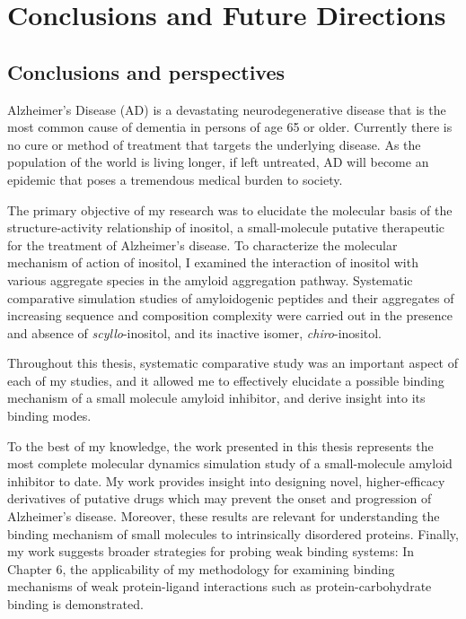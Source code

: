 

\chapter{Conclusions and Future Directions}
\section{Conclusions and perspectives}
Alzheimer's Disease (AD) is a devastating neurodegenerative disease that is the most common cause of dementia in persons of age 65 or older. Currently there is no cure or method of treatment that targets the underlying disease.  As the population of the world is living longer, if left untreated, AD will become an epidemic that poses a tremendous medical burden to society. 

The primary objective of my research was to elucidate the molecular basis of the structure-activity relationship of inositol, a small-molecule putative therapeutic for the treatment of Alzheimer's disease.  To characterize the molecular mechanism of action of inositol, I examined the interaction of inositol with various aggregate species in the amyloid aggregation pathway. Systematic comparative simulation studies of amyloidogenic peptides and their aggregates of increasing sequence and composition complexity were carried out in the presence and absence of \emph{scyllo}-inositol, and its inactive isomer, \emph{chiro}-inositol.

Throughout this thesis, systematic comparative study was an important aspect of each of my studies, and it allowed me to effectively elucidate a possible binding mechanism of a small molecule amyloid inhibitor, and derive insight into its binding modes. %

To the best of my knowledge, the work presented in this thesis represents the most complete molecular dynamics simulation study of a small-molecule amyloid inhibitor to date. My work provides insight into designing novel, higher-efficacy derivatives of putative drugs which may prevent the onset and progression of Alzheimer's disease.  Moreover, these results are relevant for understanding the binding mechanism of small molecules to intrinsically disordered proteins. Finally, my work suggests broader strategies for probing weak binding systems: In Chapter 6, the applicability of my methodology for examining binding mechanisms of weak protein-ligand interactions such as protein-carbohydrate binding is demonstrated. 

